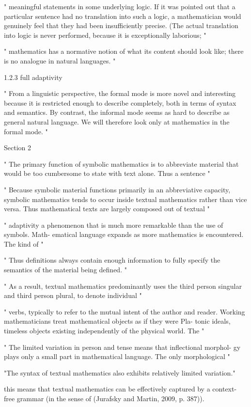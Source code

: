 "
meaningful statements in some underlying logic. If it was pointed out that
a particular sentence had no translation into such a logic, a mathematician
would genuinely feel that they had been insufficiently precise. (The actual
translation into logic is never performed, because it is exceptionally laborious;
"

"
mathematics has a normative notion of what its content should look like; there is no
analogue in natural languages.
"

1.2.3 full adaptivity


"
From a linguistic perspective, the formal mode is more novel and interesting
because it is restricted enough to describe completely, both in terms of syntax
and semantics. By contrast, the informal mode seems as hard to describe as
general natural language. We will therefore look only at mathematics in the
formal mode.
"


Section 2

"
The primary function of symbolic mathematics is to abbreviate material
that would be too cumbersome to state with text alone. Thus a sentence
"

"
Because symbolic material functions primarily in an abbreviative capacity,
symbolic mathematics tends to occur inside textual mathematics rather than
vice versa. Thus mathematical texts are largely composed out of textual
"

"
adaptivity
a phenomenon that is much more remarkable than the use of symbols. Math-
ematical language expands as more mathematics is encountered. The kind of
"

"
Thus definitions always contain enough information to fully specify the
semantics of the material being defined.
"

"
As a result, textual mathematics predominantly
uses the third person singular and third person plural, to denote individual
"

"
verbs, typically to refer to the mutual intent of the author and reader.
Working mathematicians treat mathematical objects as if they were Pla-
tonic ideals, timeless objects existing independently of the physical world. The
"

"
The limited variation in person and tense means that inflectional morphol-
gy plays only a small part in mathematical language. The only morphological
"

"The syntax of textual mathematics also exhibits relatively limited variation."


this means that textual mathematics can be effectively captured by a context-
free grammar (in the sense of (Jurafsky and Martin, 2009, p. 387)).

